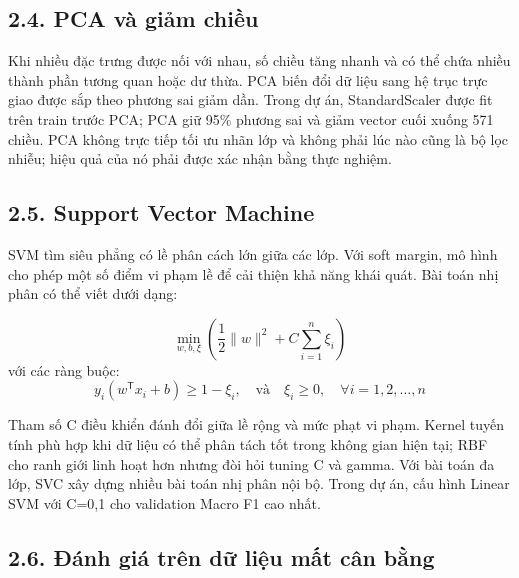 \documentclass[12pt,a4paper]{article}
\begin{document}
\subsection{2.4. PCA và giảm
chiều}\label{pca-vuxe0-giux1ea3m-chiux1ec1u}

Khi nhiều đặc trưng được nối với nhau, số chiều tăng nhanh và có thể
chứa nhiều thành phần tương quan hoặc dư thừa. PCA biến đổi dữ liệu sang
hệ trục trực giao được sắp theo phương sai giảm dần. Trong dự án,
StandardScaler được fit trên train trước PCA; PCA giữ 95\% phương sai và
giảm vector cuối xuống 571 chiều. PCA không trực tiếp tối ưu nhãn lớp và
không phải lúc nào cũng là bộ lọc nhiễu; hiệu quả của nó phải được xác
nhận bằng thực nghiệm.

\subsection{2.5. Support Vector Machine}\label{support-vector-machine}

SVM tìm siêu phẳng có lề phân cách lớn giữa các lớp. Với soft margin, mô
hình cho phép một số điểm vi phạm lề để cải thiện khả năng khái quát.
Bài toán nhị phân có thể viết dưới dạng:

\begin{equation}                                         
\min_{w, b, \xi} \left( \frac{1}{2} \|w\|^2 + C      
\sum_{i=1}^{n} \xi_i \right)                               
\end{equation}                                           
với các ràng buộc:                                       
\begin{equation}                                         
y_i (w^{\mathsf{T}}x_i + b) \ge 1 - \xi_i, \quad     
\text{và} \quad \xi_i \ge 0, \quad \forall i = 1, 2, \dots,
n                                                          
\end{equation}   

Tham số C điều khiển đánh đổi giữa lề rộng và mức phạt vi phạm. Kernel
tuyến tính phù hợp khi dữ liệu có thể phân tách tốt trong không gian
hiện tại; RBF cho ranh giới linh hoạt hơn nhưng đòi hỏi tuning C và
gamma. Với bài toán đa lớp, SVC xây dựng nhiều bài toán nhị phân nội bộ.
Trong dự án, cấu hình Linear SVM với C=0,1 cho validation Macro F1 cao
nhất.

\subsection{2.6. Đánh giá trên dữ liệu mất cân
bằng}\label{ux111uxe1nh-giuxe1-truxean-dux1eef-liux1ec7u-mux1ea5t-cuxe2n-bux1eb1ng}
\end{document}
